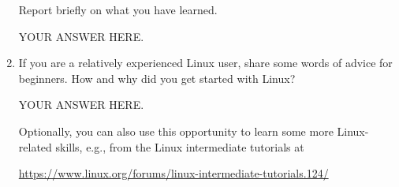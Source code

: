 \documentclass[12pt]{article}
\begin{document}
\begin{enumerate}
Report briefly on what you have learned.

YOUR ANSWER HERE.

\item If you are a relatively experienced Linux user, share some words of advice for beginners. How and why did you get started with Linux?  

YOUR ANSWER HERE.

Optionally, you can also use this opportunity to learn some more Linux-related skills, e.g., from the Linux intermediate tutorials at

\url{https://www.linux.org/forums/linux-intermediate-tutorials.124/}


\end{enumerate}
\end{document}

